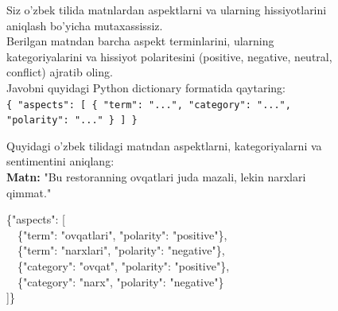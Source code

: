 \documentclass[bdcc,article,submit,moreauthors]{Definitions/mdpi}
\begin{document}
\begin{figure}[t]
\centering
\begin{minipage}{0.95\textwidth}

\begin{tcolorbox}[enhanced, colback=red!5!white, colframe=red!75!black, 
  title=\texttt{<|im\_start|>system}, fonttitle=\bfseries, 
  attach boxed title to top left={yshift=-2mm, xshift=5mm},
  boxed title style={colback=red!75!black}]
\footnotesize
Siz o'zbek tilida matnlardan aspektlarni va ularning hissiyotlarini aniqlash bo'yicha mutaxassissiz.\\
Berilgan matndan barcha aspekt terminlarini, ularning kategoriyalarini va hissiyot polaritesini (positive, negative, neutral, conflict) ajratib oling.\\
Javobni quyidagi Python dictionary formatida qaytaring:\\
\texttt{\{ "aspects": [ \{ "term": "...", "category": "...", "polarity": "..." \} ] \}}
\end{tcolorbox}

\vspace{-2mm}

\begin{tcolorbox}[enhanced, colback=blue!5!white, colframe=blue!75!black, 
  title=\texttt{<|im\_start|>user}, fonttitle=\bfseries, 
  attach boxed title to top left={yshift=-2mm, xshift=5mm},
  boxed title style={colback=blue!75!black}]
\footnotesize
Quyidagi o'zbek tilidagi matndan aspektlarni, kategoriyalarni va sentimentini aniqlang:\\
\textbf{Matn:} "Bu restoranning ovqatlari juda mazali, lekin narxlari qimmat."
\end{tcolorbox}

\vspace{-2mm}

\begin{tcolorbox}[enhanced, colback=green!5!white, colframe=green!50!black, 
  title=\texttt{<|im\_start|>assistant}, fonttitle=\bfseries, 
  attach boxed title to top left={yshift=-2mm, xshift=5mm},
  boxed title style={colback=green!50!black}]
\footnotesize\ttfamily
\{"aspects": [\\
\ \ \{"term": "ovqatlari", "polarity": "positive"\},\\
\ \ \{"term": "narxlari", "polarity": "negative"\},\\
\ \ \{"category": "ovqat", "polarity": "positive"\},\\
\ \ \{"category": "narx", "polarity": "negative"\}\\
]\}
\end{tcolorbox}


\end{minipage}
\end{figure}
\end{document}
